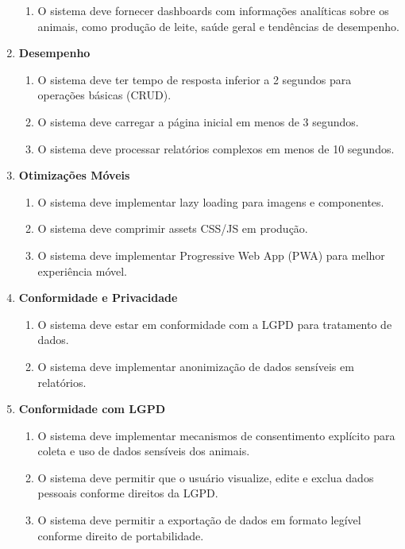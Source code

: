 \documentclass[12pt, a4paper]{article}
\begin{document}
\begin{spacing}{1.5}
\begin{spacing}{1.5}
\begin{enumerate}[label=RNF0\arabic{*}.]
    \begin{enumerate}[label=RNF05.0\arabic{*}]
        \item O sistema deve fornecer dashboards com informações analíticas sobre os animais, como produção de leite, saúde geral e tendências de desempenho.
    \end{enumerate}
    \item \textbf{Desempenho}
    \begin{enumerate}[label=RNF06.0\arabic{*}]
        \item O sistema deve ter tempo de resposta inferior a 2 segundos para operações básicas (CRUD).
        \item O sistema deve carregar a página inicial em menos de 3 segundos.
        \item O sistema deve processar relatórios complexos em menos de 10 segundos.
    \end{enumerate}
    \item \textbf{Otimizações Móveis}
    \begin{enumerate}[label=RNF07.0\arabic{*}]
        \item O sistema deve implementar lazy loading para imagens e componentes.
        \item O sistema deve comprimir assets CSS/JS em produção.
        \item O sistema deve implementar Progressive Web App (PWA) para melhor experiência móvel.
    \end{enumerate}
    \item \textbf{Conformidade e Privacidade}
    \begin{enumerate}[label=RNF08.0\arabic{*}]
        \item O sistema deve estar em conformidade com a LGPD para tratamento de dados.
        \item O sistema deve implementar anonimização de dados sensíveis em relatórios.
    \end{enumerate}
    \item \textbf{Conformidade com LGPD}
    \begin{enumerate}[label=RNF09.0\arabic{*}]
        \item O sistema deve implementar mecanismos de consentimento explícito para coleta e uso de dados sensíveis dos animais.
        \item O sistema deve permitir que o usuário visualize, edite e exclua dados pessoais conforme direitos da LGPD.
        \item O sistema deve permitir a exportação de dados em formato legível conforme direito de portabilidade.
    \end{enumerate}
\end{enumerate}
\end{spacing}


\end{spacing}
\end{document}
